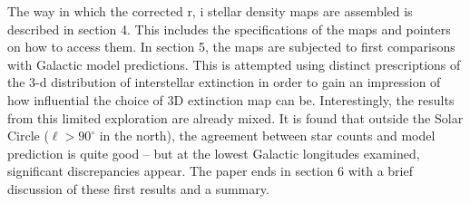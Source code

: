 \documentclass[a4paper,useAMS,usenatbib]{mn2e}
\begin{document}
The way in which the corrected r, i stellar density maps are assembled is described in 
section 4.  This includes the specifications of the maps and pointers on how to access 
them.  In section 5, the maps are subjected to first comparisons with Galactic 
model predictions.  This is attempted using distinct prescriptions of the 3-d 
distribution of interstellar extinction in order to gain an impression of how influential 
the choice of 3D extinction map can be.  Interestingly, the results from this limited
exploration are already mixed. It is found that outside the Solar Circle ($\ell > 90^{\circ}$ 
in the north), the agreement between star counts and model prediction is quite good 
-- but at the lowest Galactic longitudes examined, significant discrepancies appear.  The
paper ends in section 6 with a brief discussion of these first results and a summary.
\end{document}
